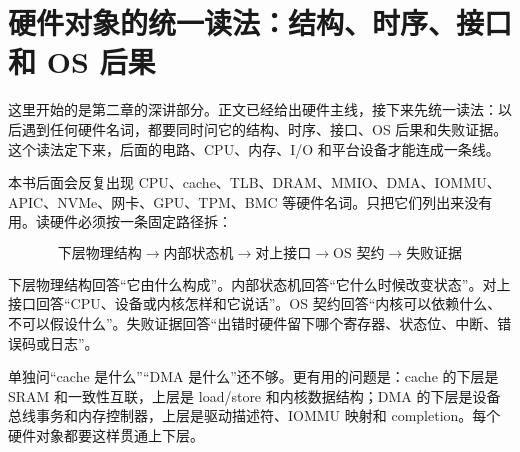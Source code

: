 \section{硬件对象的统一读法：结构、时序、接口和 OS 后果}

这里开始的是第二章的深讲部分。正文已经给出硬件主线，接下来先统一读法：以后遇到任何硬件名词，都要同时问它的结构、时序、接口、OS 后果和失败证据。这个读法定下来，后面的电路、CPU、内存、I/O 和平台设备才能连成一条线。

本书后面会反复出现 CPU、cache、TLB、DRAM、MMIO、DMA、IOMMU、APIC、NVMe、网卡、GPU、TPM、BMC 等硬件名词。只把它们列出来没有用。读硬件必须按一条固定路径拆：

\[
\text{下层物理结构}
\rightarrow
\text{内部状态机}
\rightarrow
\text{对上接口}
\rightarrow
\text{OS 契约}
\rightarrow
\text{失败证据}
\]

下层物理结构回答“它由什么构成”。内部状态机回答“它什么时候改变状态”。对上接口回答“CPU、设备或内核怎样和它说话”。OS 契约回答“内核可以依赖什么、不可以假设什么”。失败证据回答“出错时硬件留下哪个寄存器、状态位、中断、错误码或日志”。

\begin{keyidea}
单独问“cache 是什么”“DMA 是什么”还不够。更有用的问题是：cache 的下层是 SRAM 和一致性互联，上层是 load/store 和内核数据结构；DMA 的下层是设备总线事务和内存控制器，上层是驱动描述符、IOMMU 映射和 completion。每个硬件对象都要这样贯通上下层。
\end{keyidea}


